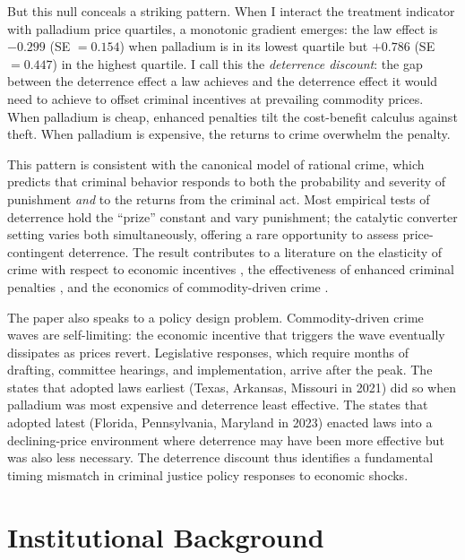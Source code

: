 \documentclass[12pt]{article}
\begin{document}
But this null conceals a striking pattern. When I interact the treatment indicator with palladium price quartiles, a monotonic gradient emerges: the law effect is $-0.299$ (SE $= 0.154$) when palladium is in its lowest quartile but $+0.786$ (SE $= 0.447$) in the highest quartile. I call this the \textit{deterrence discount}: the gap between the deterrence effect a law achieves and the deterrence effect it would need to achieve to offset criminal incentives at prevailing commodity prices. When palladium is cheap, enhanced penalties tilt the cost-benefit calculus against theft. When palladium is expensive, the returns to crime overwhelm the penalty.

This pattern is consistent with the canonical \citet{becker1968crime} model of rational crime, which predicts that criminal behavior responds to both the probability and severity of punishment \textit{and} to the returns from the criminal act. Most empirical tests of deterrence hold the ``prize'' constant and vary punishment; the catalytic converter setting varies both simultaneously, offering a rare opportunity to assess price-contingent deterrence. The result contributes to a literature on the elasticity of crime with respect to economic incentives \citep{ehrlich1973participation, freeman1999economics, draca2011panic}, the effectiveness of enhanced criminal penalties \citep{chalfin2018criminal, nagin2013deterrence}, and the economics of commodity-driven crime \citep{dube2013cross, berman2011can}.

The paper also speaks to a policy design problem. Commodity-driven crime waves are self-limiting: the economic incentive that triggers the wave eventually dissipates as prices revert. Legislative responses, which require months of drafting, committee hearings, and implementation, arrive after the peak. The states that adopted laws earliest (Texas, Arkansas, Missouri in 2021) did so when palladium was most expensive and deterrence least effective. The states that adopted latest (Florida, Pennsylvania, Maryland in 2023) enacted laws into a declining-price environment where deterrence may have been more effective but was also less necessary. The deterrence discount thus identifies a fundamental timing mismatch in criminal justice policy responses to economic shocks.

\section{Institutional Background}
\end{document}
